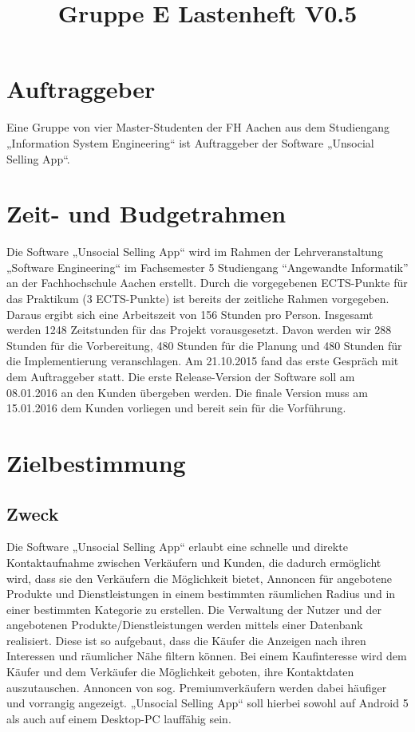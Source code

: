 \documentclass[a4paper,12pt,oneside]{scrartcl}
\title{Gruppe E Lastenheft V0.5}
\begin{document}
\maketitle
\newpage
\tableofcontents
\newpage

\section{Auftraggeber}
Eine Gruppe von vier Master-Studenten der FH Aachen aus dem Studiengang „Information System Engineering“ ist Auftraggeber der Software „Unsocial Selling App“. 




\section{Zeit- und Budgetrahmen}
Die Software „Unsocial Selling App“ wird im Rahmen der Lehrveranstaltung „Software Engineering“ im Fachsemester 5 Studiengang “Angewandte Informatik” an der Fachhochschule Aachen erstellt.
Durch die vorgegebenen ECTS-Punkte für das Praktikum (3 ECTS-Punkte) ist bereits der zeitliche Rahmen vorgegeben.
Daraus ergibt sich eine Arbeitszeit von 156 Stunden pro Person. Insgesamt werden 1248 Zeitstunden für das Projekt vorausgesetzt. 
Davon werden wir 288 Stunden für die Vorbereitung, 480 Stunden für die Planung und 480 Stunden für die Implementierung veranschlagen. 
Am 21.10.2015 fand das erste Gespräch mit dem Auftraggeber statt.
Die erste Release-Version der Software soll am 08.01.2016 an den Kunden übergeben werden.
Die finale Version muss am 15.01.2016 dem Kunden vorliegen und bereit sein für die Vorführung. 




\section{Zielbestimmung}
\subsection{Zweck}
Die Software „Unsocial Selling App“ erlaubt eine schnelle und direkte Kontaktaufnahme zwischen Verkäufern und Kunden, die dadurch ermöglicht wird, dass sie den Verkäufern die Möglichkeit bietet, Annoncen für angebotene Produkte und Dienstleistungen in einem bestimmten räumlichen Radius und in einer bestimmten Kategorie zu erstellen.
Die Verwaltung der Nutzer und der angebotenen Produkte/Dienstleistungen werden mittels einer Datenbank realisiert.
Diese ist so aufgebaut, dass die Käufer die Anzeigen nach ihren Interessen und räumlicher Nähe filtern können.
Bei einem Kaufinteresse wird dem Käufer und dem Verkäufer die Möglichkeit geboten, ihre Kontaktdaten auszutauschen.
Annoncen von sog. Premiumverkäufern werden dabei häufiger und vorrangig angezeigt.
„Unsocial Selling App“ soll hierbei sowohl auf Android 5 als auch auf einem Desktop-PC lauffähig sein.
\end{document}
